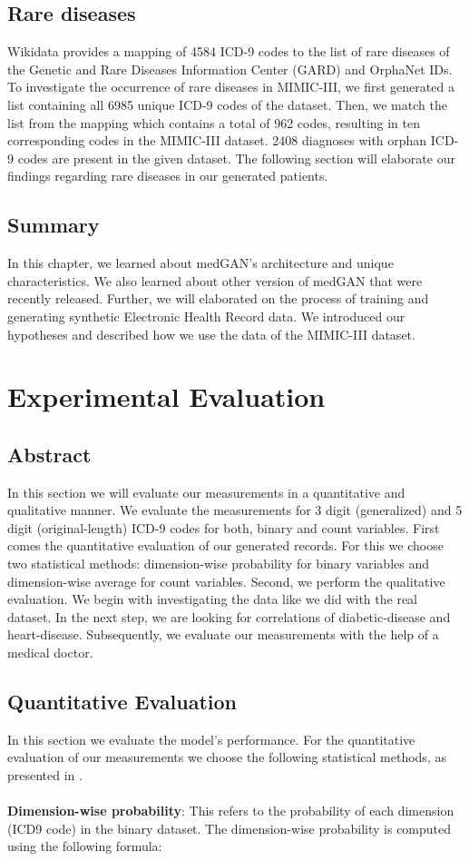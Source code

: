 \documentclass[11pt, a4paper, oneside]{book}
\begin{document}
\section{Rare diseases}
Wikidata provides a mapping of 4584 ICD-9 codes to the list of rare diseases of the Genetic and Rare Diseases Information Center (GARD) and OrphaNet IDs.
To investigate the occurrence of rare diseases in MIMIC-III, we first generated a list containing all 6985 unique ICD-9 codes of the dataset. Then, we match the list from the mapping which contains a total of 962 codes, resulting in ten corresponding codes in the MIMIC-III dataset. 2408 diagnoses with orphan ICD-9 codes are present in the given dataset.
The following section will elaborate our findings regarding rare diseases in our generated patients.
\section{Summary}
In this chapter, we learned about medGAN's architecture and unique characteristics. We also learned about other version of medGAN that were recently released. Further, we will elaborated on the process of training and generating synthetic Electronic Health Record data. We introduced our hypotheses and described how we use the data of the MIMIC-III dataset.

\chapter{Experimental Evaluation}
\section{Abstract}
In this section we will evaluate our measurements in a quantitative and qualitative manner. We evaluate the measurements for 3 digit (generalized) and 5 digit (original-length) ICD-9 codes for both, binary and count variables.
First comes the quantitative evaluation of our generated records. For this we choose two statistical methods: dimension-wise probability for binary variables and dimension-wise average for count variables.
Second, we perform the qualitative evaluation. We begin with investigating the data like we did with the real dataset. In the next step, we are looking for correlations of diabetic-disease and heart-disease. Subsequently, we evaluate our measurements with the help of a medical doctor.

\section{Quantitative Evaluation}
In this section we evaluate the model's performance. For the quantitative evaluation of our measurements we choose the following statistical methods, as presented in \citep{Choi2017}.
\\
\\
\textbf{Dimension-wise probability}: This refers to the probability of each dimension (ICD9 code) in the binary dataset. The dimension-wise probability is computed using the following formula: 
\end{document}

